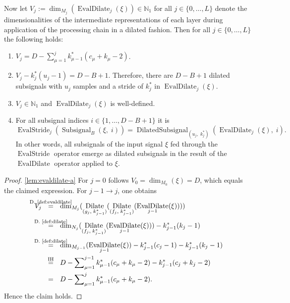 \documentclass[journal]{IEEEtran}
\newcommand{\N}{\mathbb{N}}
\newcommand{\ROI}{B}
\newcommand{\discint}[2]{\{#1,\dotsc,#2\}}
\newcommand{\inint}[2]{\in\discint{#1}{#2}}
\DeclareMathOperator{\Subsignal}{Subsignal}
\DeclareMathOperator{\EvalStride}{EvalStride}
\newcommand{\equsing}[1]{\overset{\mathclap{\text{#1}}}{=}}
\DeclareMathOperator{\DilatedSubsignal}{DilatedSubsignal}
\DeclareMathOperator{\Dilate}{Dilate}
\DeclareMathOperator{\EvalDilate}{EvalDilate}
\begin{document}
\begin{lemma}
Now let $V_j := \dim_{M_j}(\EvalDilate_j(\xi))\in\N_1$ for all $j\inint{0}{L}$ denote the dimensionalities of the intermediate representations of each layer during application of the processing chain in a dilated fashion.
Then for all $j\inint{0}{L}$ the following holds:
\begin{enumerate}
  \item \label{lem:evaldilate-a} $V_j = D - \sum_{\mu = 1}^j k_{\mu - 1}^*(c_\mu + k_\mu - 2)$.
  \item \label{lem:evaldilate-b} $V_j - k_j^*(u_j - 1) = D - \ROI + 1$. Therefore, there are $D - \ROI + 1$ dilated subsignals with $u_j$ samples and a stride of $k_j^*$ in $\EvalDilate_j(\xi)$.
  \item \label{lem:evaldilate-c} $V_j\in\N_1$ and $\EvalDilate_j(\xi)$ is well-defined.
  \item \label{lem:evaldilate-d} For all subsignal indices $i\inint{1}{D - \ROI + 1}$ it is 
    \begin{displaymath}
      \EvalStride_j(\Subsignal_\ROI(\xi,\; i)) = \DilatedSubsignal_{(u_j,\; k_j^*)}(\EvalDilate_j(\xi),\; i)\text{.}
    \end{displaymath}
    In other words, all subsignals of the input signal $\xi$ fed through the $\EvalStride$ operator emerge as dilated subsignals in the result of the $\EvalDilate$ operator applied to $\xi$.
\end{enumerate}
\end{lemma}\begin{proof}
\ref{lem:evaldilate-a}
For $j = 0$ follows $V_0 = \dim_{M_0}(\xi) = D$, which equals the claimed expression.
For $j - 1 \to j$, one obtains
\begin{align*}
  V_j\ \ 
  &\equsing{D.~\ref{def:evaldilate}}\ \ \dim_{M_j}( \Dilate_{(g_j,\; k_{j - 1}^*)}( \Dilate_{(f_j,\; k_{j - 1}^*)}( \EvalDilate_{j - 1}(\xi) ) ) )\\
  &\equsing{D.~\ref{def:dilate}}\ \ \dim_{N_j}( \Dilate_{(f_j,\; k_{j - 1}^*)}( \EvalDilate_{j - 1}(\xi) ) ) - k_{j - 1}^*(k_j - 1)\\
  &\equsing{D.~\ref{def:dilate}}\ \ \dim_{M_{j - 1}}( \EvalDilate_{j - 1}(\xi) ) - k_{j - 1}^*(c_j - 1) - k_{j - 1}^*(k_j - 1)\\
  &\equsing{IH}\ \ D - \sum\nolimits_{\mu = 1}^{j - 1} k_{\mu - 1}^*(c_\mu + k_\mu - 2) - k_{j - 1}^*(c_j + k_j - 2)\\
  &=\ \ D - \sum\nolimits_{\mu = 1}^j k_{\mu - 1}^*(c_\mu + k_\mu - 2)\text{.}
\end{align*}
Hence the claim holds.


\end{proof}
\end{document}
